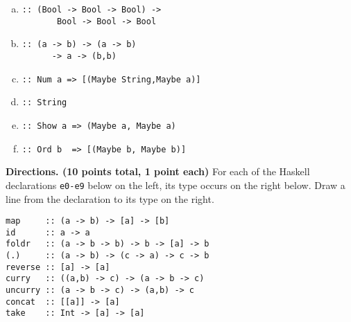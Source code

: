 \documentclass[12pt]{article}
\begin{document}
\begin{enumerate}
\begin{minipage}{2in}
\begin{enumerate}[(a)]
\item \begin{verbatim}
:: (Bool -> Bool -> Bool) -> 
       Bool -> Bool -> Bool
\end{verbatim}

\item \begin{verbatim}
:: (a -> b) -> (a -> b) 
      -> a -> (b,b)
\end{verbatim}
\item \begin{verbatim}
:: Num a => [(Maybe String,Maybe a)]
\end{verbatim}

\item \begin{verbatim}
:: String
\end{verbatim}

\item \begin{verbatim}
:: Show a => (Maybe a, Maybe a)
\end{verbatim}

\item \begin{verbatim}
:: Ord b  => [(Maybe b, Maybe b)]
\end{verbatim}


\end{enumerate}
\end{minipage}


\newpage

{\bf Directions. (10 points total, 1 point each)} For each of the Haskell declarations \verb+e0-e9+ below on the left, its type
occurs on the right below. Draw a line from the declaration to its type on the right.
\begin{verbatim}
map     :: (a -> b) -> [a] -> [b]
id      :: a -> a
foldr   :: (a -> b -> b) -> b -> [a] -> b
(.)     :: (a -> b) -> (c -> a) -> c -> b
reverse :: [a] -> [a]
curry   :: ((a,b) -> c) -> (a -> b -> c)
uncurry :: (a -> b -> c) -> (a,b) -> c
concat  :: [[a]] -> [a]
take    :: Int -> [a] -> [a]
\end{verbatim}


\end{enumerate}
\end{document}
